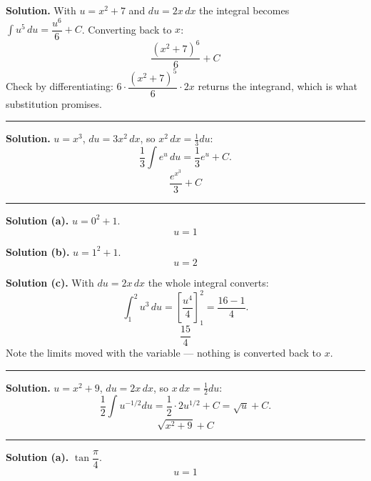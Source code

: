 \documentclass[12pt]{article}
\begin{document}



\textbf{Solution.} With $u = x^2 + 7$ and $du = 2x\,dx$ the integral becomes
$\int u^5\,du = \dfrac{u^6}{6} + C$. Converting back to $x$:
\[ \boxed{\frac{\left(x^2 + 7\right)^6}{6} + C} \]
Check by differentiating: $6\cdot\dfrac{(x^2+7)^5}{6}\cdot 2x$ returns the
integrand, which is what substitution promises.

\vspace{0.15cm}\noindent\rule{\linewidth}{0.2pt}


\textbf{Solution.} $u = x^3$, $du = 3x^2\,dx$, so $x^2\,dx = \tfrac{1}{3}du$:
\[ \frac{1}{3}\int e^u\,du = \frac{1}{3}e^u + C. \]
\[ \boxed{\frac{e^{x^3}}{3} + C} \]

\vspace{0.15cm}\noindent\rule{\linewidth}{0.2pt}


\textbf{Solution (a).} $u = 0^2 + 1$.
\[ \boxed{u = 1} \]

\textbf{Solution (b).} $u = 1^2 + 1$.
\[ \boxed{u = 2} \]

\textbf{Solution (c).} With $du = 2x\,dx$ the whole integral converts:
\[ \int_1^{2} u^3\,du = \left[\frac{u^4}{4}\right]_1^{2} = \frac{16 - 1}{4}. \]
\[ \boxed{\frac{15}{4}} \]
Note the limits moved with the variable --- nothing is converted back to $x$.

\vspace{0.15cm}\noindent\rule{\linewidth}{0.2pt}


\textbf{Solution.} $u = x^2 + 9$, $du = 2x\,dx$, so $x\,dx = \tfrac{1}{2}du$:
\[ \frac{1}{2}\int u^{-1/2}du = \frac{1}{2}\cdot 2u^{1/2} + C = \sqrt{u} + C. \]
\[ \boxed{\sqrt{x^2 + 9} + C} \]

\vspace{0.15cm}\noindent\rule{\linewidth}{0.2pt}


\textbf{Solution (a).} $\tan\dfrac{\pi}{4}$.
\[ \boxed{u = 1} \]
\end{document}
